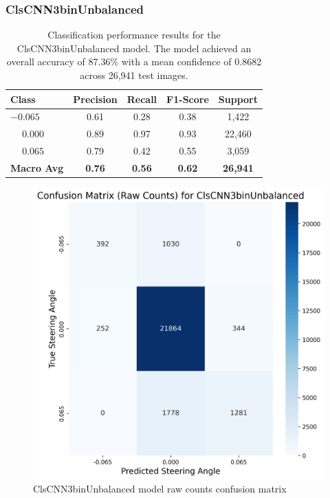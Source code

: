 \subsubsection{ClsCNN3binUnbalanced}

\begin{table}[htbp]
\centering
\begin{tabular}{@{}lcccc@{}}
\toprule
\textbf{Class} & \textbf{Precision} & \textbf{Recall} & \textbf{F1-Score} & \textbf{Support} \\
\midrule
$-0.065$ & 0.61 & 0.28 & 0.38 & 1,422 \\
$\phantom{-}0.000$ & 0.89 & 0.97 & 0.93 & 22,460 \\
$\phantom{-}0.065$ & 0.79 & 0.42 & 0.55 & 3,059 \\
\midrule
\textbf{Macro Avg} & \textbf{0.76} & \textbf{0.56} & \textbf{0.62} & \textbf{26,941} \\
\bottomrule
\end{tabular}
\caption{Classification performance results for the ClsCNN3binUnbalanced model. The model achieved an overall accuracy of 87.36\% with a mean confidence of 0.8682 across 26,941 test images.}
\label{tab:clf_report_ClsCNN3binUnbalanced}
\end{table}

\begin{figure}[H]
\centering
\includegraphics[width=0.65\linewidth]{Figures/Results/cm_raw_ClsCNN3binUnbalanced.png}
\caption{ClsCNN3binUnbalanced model raw counts confusion matrix}
\label{fig:cm_raw_ClsCNN3binUnbalanced}
\end{figure}

